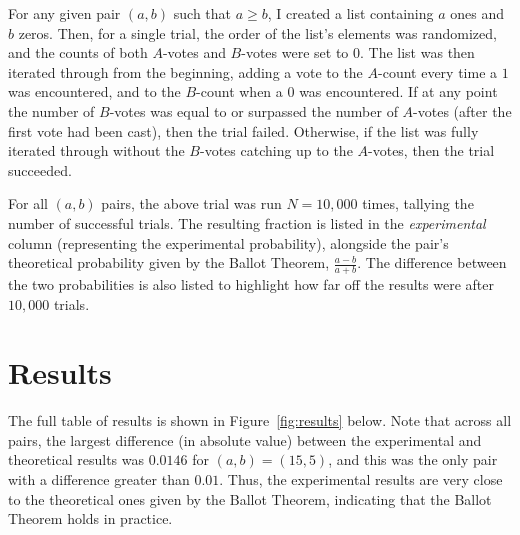 \documentclass[11pt]{article}
\theoremstyle{plain}
\begin{document}
For any given pair $(a,b)$ such that $a \geq b$, I created a list containing
$a$ ones and $b$ zeros. Then, for a single trial, the order of the list's
elements was randomized, and the counts of both $A$-votes and $B$-votes were set
to $0$. The list was then iterated through from the beginning, adding a vote to
the $A$-count every time a $1$ was encountered, and to the $B$-count when a $0$
was encountered. If at any point the number of $B$-votes was equal to or
surpassed the number of $A$-votes (after the first vote had been cast), then the
trial failed. Otherwise, if the list was fully iterated through without the
$B$-votes catching up to the $A$-votes, then the trial succeeded.

For all $(a,b)$ pairs, the above trial was run $N = 10{,}000$ times, tallying
the number of successful trials. The resulting fraction is listed in the
\emph{experimental} column (representing the experimental probability),
alongside the pair's theoretical probability given by the Ballot Theorem,
$\frac{a-b}{a+b}$. The difference between the two probabilities is also listed
to highlight how far off the results were after $10{,}000$ trials.

\section{Results}

The full table of results is shown in Figure~\ref{fig:results} below. Note that
across all pairs, the largest difference (in absolute value) between the
experimental and theoretical results was $0.0146$ for $(a,b) = (15,5)$, and this
was the only pair with a difference greater than $0.01$. Thus, the experimental
results are very close to the theoretical ones given by the Ballot Theorem,
indicating that the Ballot Theorem holds in practice.
\end{document}
